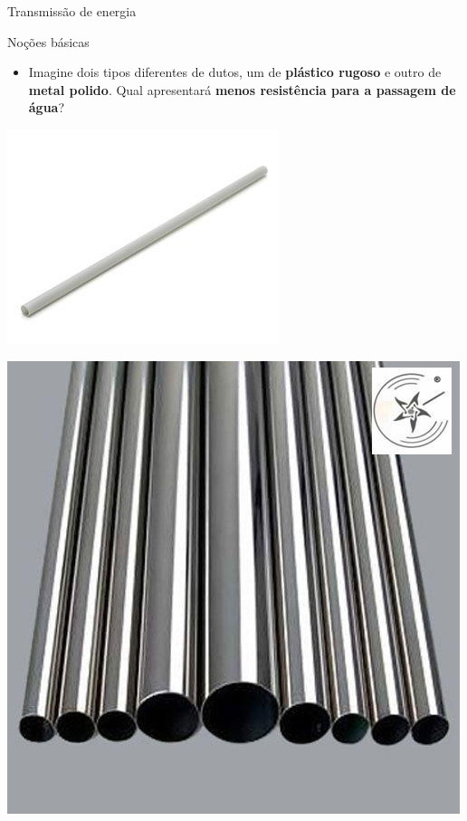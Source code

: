 \begin{frame}{Transmissão de energia}
	\begin{block}{Noções básicas}
		\begin{itemize}
			\item Imagine dois tipos diferentes de dutos, um de \textbf{plástico rugoso} e outro de \textbf{metal polido}. Qual apresentará \textbf{menos resistência para a passagem de água}?
		\end{itemize}
	\end{block}

	\medskip

	\begin{minipage}{0.49\linewidth}
		\centering
		\includegraphics[width=\linewidth]{Figuras/Ch03/fig4}
	\end{minipage}
	\hfill
	\begin{minipage}{0.49\linewidth}
		\centering
		\includegraphics[width=\linewidth]{Figuras/Ch03/fig5}
	\end{minipage}

\end{frame}


